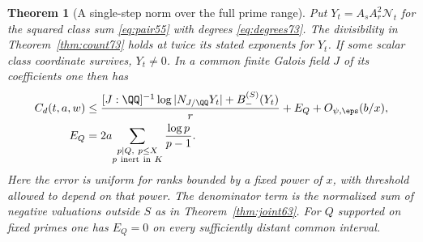 \documentclass[a4paper,11pt]{article}
\newtheorem{theorem}[proposition]{Theorem}
\theoremstyle{definition}
\theoremstyle{remark}
\numberwithin{equation}{section}
\begin{document}
\begin{theorem}[A single-step norm over the full prime range]\label{thm:norm73}
Put \(Y_t=A_s A_r^2\mathcal N_t\) for the squared class sum
\eqref{eq:pair55} with degrees \eqref{eq:degrees73}.
The divisibility in Theorem~\ref{thm:count73} holds at twice
its stated exponents for \(Y_t\). If some scalar class
coordinate survives, \(Y_t\ne0\). In a common finite Galois
field \(J\) of its coefficients one then has
\begin{align}
 C_d(t,a,w)\le{}&
    \frac{[J:\QQ]^{-1}\log|N_{J/\QQ}Y_t|
                     +B_-^{(S)}(Y_t)}{r}
          +E_Q+O_{\psi,\eps}(b/x),                         \label{eq:norm73}\\
 E_Q={}&2a\!\sum_{\substack{p\mid Q,\ p\le X\\p\ {\rm inert\ in}\ K}}
                       \frac{\log p}{p-1}.                 \notag
\end{align}
Here the error is uniform for ranks bounded by a fixed power
of \(x\), with threshold allowed to depend on that power.
The denominator term is the normalized sum of negative
valuations outside \(S\) as in Theorem~\ref{thm:joint63}.
For \(Q\) supported on fixed primes one has \(E_Q=0\) on
every sufficiently distant common interval.
\end{theorem}
\end{document}
